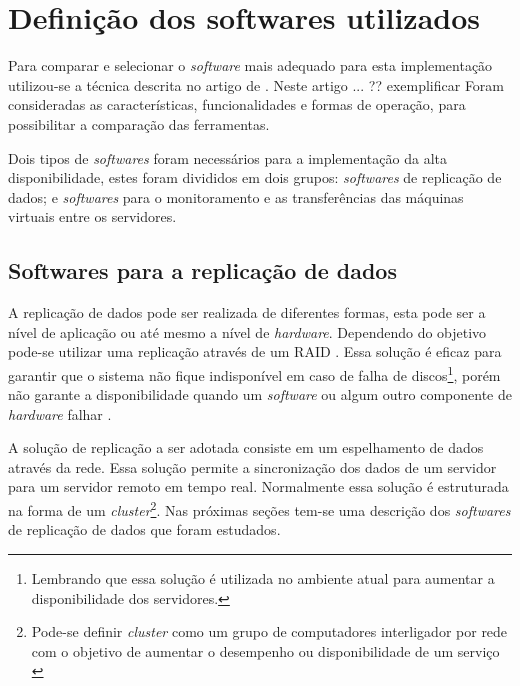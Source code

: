 \section{Definição dos softwares utilizados}
\label{section:propostasolucao}

Para comparar e selecionar o \textit{software} mais adequado para esta implementação utilizou-se a técnica descrita no artigo 
de \cite{thome2013}. Neste artigo ... ?? exemplificar
Foram consideradas as características, funcionalidades e formas de operação, para possibilitar a comparação das ferramentas.

Dois tipos de \textit{softwares} foram necessários para a implementação da alta disponibilidade, estes foram divididos em dois grupos: 
\textit{softwares} de replicação de dados; e \textit{softwares} para o monitoramento e as transferências das máquinas virtuais entre os servidores.

\subsection{Softwares para a replicação de dados}
\label{section:toolrepl}

A replicação de dados pode ser realizada de diferentes formas, esta pode ser a nível de aplicação ou até mesmo a nível de \textit{hardware}.
Dependendo do objetivo pode-se utilizar uma replicação através de um \ac{RAID} \cite{tanenbaum2009sistemas}. Essa solução é eficaz para garantir 
que o sistema não fique indisponível em caso de falha de discos\footnote[1]{Lembrando que essa solução é utilizada no ambiente atual para 
aumentar a disponibilidade dos servidores.}, porém não garante a disponibilidade quando um \textit{software} ou algum outro componente de 
\textit{hardware} falhar \cite{zaminhani2008}.

A solução de replicação a ser adotada consiste em um espelhamento de dados através da rede. Essa solução permite a sincronização dos dados de um 
servidor para um servidor remoto em tempo real. Normalmente essa solução é estruturada na forma de um \textit{cluster}\footnote[2]{Pode-se definir 
\textit{cluster} como um grupo de computadores interligador por rede com o objetivo de aumentar o desempenho ou disponibilidade de um serviço 
\cite{freitas2005}}.
Nas próximas seções tem-se uma descrição dos \textit{softwares} de replicação de dados que foram estudados.



